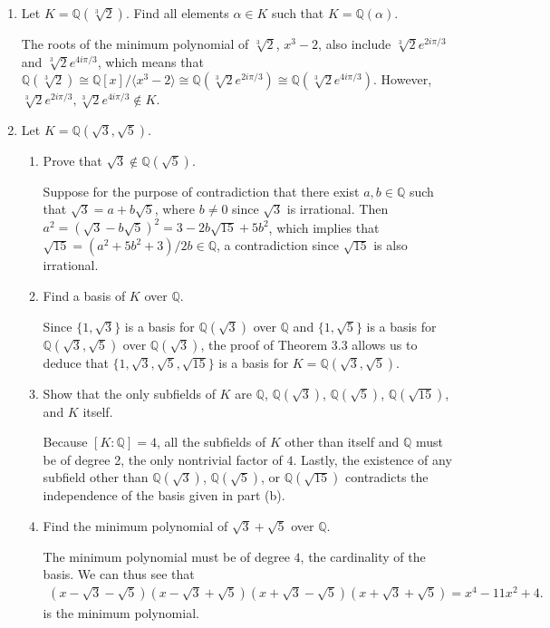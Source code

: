 \documentclass[12pt]{article}
\newcommand{\QQ}{\mathbb{Q}}
\begin{document}
\begin{enumerate}
    \item Let $K = \QQ(\sqrt[3]{2})$. Find all elements $\alpha \in K$ such that $K = \QQ(\alpha)$. \par
        The roots of the minimum polynomial of $\sqrt[3]{2}$, $x^3 - 2$, also include $\sqrt[3]{2}e^{2i\pi/3}$ and $\sqrt[3]{2}e^{4i\pi/3}$, which means that $\QQ(\sqrt[3]{2}) \cong \QQ[x]/\langle x^3 - 2 \rangle \cong \QQ(\sqrt[3]{2}e^{2i\pi/3}) \cong \QQ(\sqrt[3]{2}e^{4i\pi/3})$. However, $\sqrt[3]{2}e^{2i\pi/3}, \sqrt[3]{2}e^{4i\pi/3} \notin K$.

    \item Let $K = \QQ(\sqrt{3},\sqrt{5})$.
    \begin{enumerate}
        \item Prove that $\sqrt{3} \notin \QQ(\sqrt{5})$. \par
            Suppose for the purpose of contradiction that there exist $a, b \in \mathbb{Q}$ such that $\sqrt{3} = a + b\sqrt{5}$, where $b \neq 0$ since $\sqrt{3}$ is irrational. Then $a^2 = (\sqrt{3} - b\sqrt{5})^2 = 3 - 2b\sqrt{15} + 5b^2$, which implies that $\sqrt{15} = (a^2 + 5b^2 + 3)/2b \in \mathbb{Q}$, a contradiction since $\sqrt{15}$ is also irrational.
        \item Find a basis of $K$ over $\QQ$. \par
            Since $\{ 1, \sqrt{3} \}$ is a basis for $\QQ(\sqrt{3})$ over $\mathbb{Q}$ and $\{ 1, \sqrt{5} \}$ is a basis for $\QQ(\sqrt{3}, \sqrt{5})$ over $\mathbb{Q}(\sqrt{3})$, the proof of Theorem 3.3 allows us to deduce that $\{ 1, \sqrt{3}, \sqrt{5}, \sqrt{15} \}$ is a basis for $K = \QQ(\sqrt{3},\sqrt{5})$.
        \item Show that the only subfields of $K$ are $\QQ$, $\QQ(\sqrt{3})$, $\QQ(\sqrt{5})$, $\QQ(\sqrt{15})$, and $K$ itself. \par
            Because $[K : \QQ] = 4$, all the subfields of $K$ other than itself and $\QQ$ must be of degree 2, the only nontrivial factor of $4$. Lastly, the existence of any subfield other than $\QQ(\sqrt{3})$, $\QQ(\sqrt{5})$, or $\QQ(\sqrt{15})$ contradicts the independence of the basis given in part (b).
        \item Find the minimum polynomial of $\sqrt{3}+\sqrt{5}$ over $\QQ$. \par
            The minimum polynomial must be of degree $4$, the cardinality of the basis. We can thus see that
            \begin{align*}
                (x - \sqrt{3} - \sqrt{5})(x - \sqrt{3} + \sqrt{5})(x + \sqrt{3} - \sqrt{5})(x + \sqrt{3} + \sqrt{5}) = x^4 - 11x^2 + 4.
            \end{align*}
            is the minimum polynomial.
    \end{enumerate}


\end{enumerate}
\end{document}
